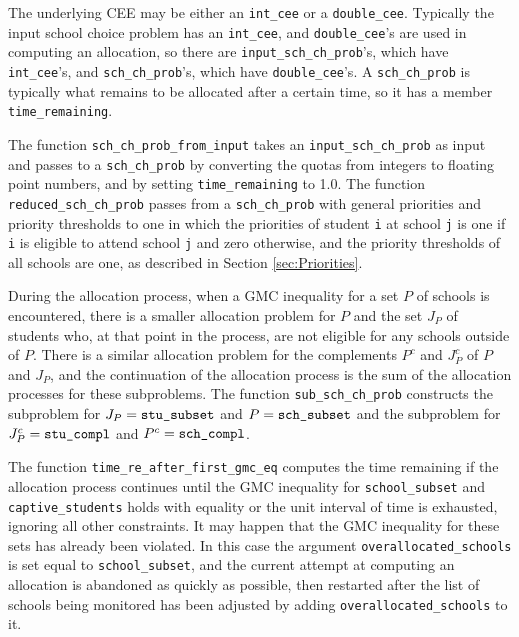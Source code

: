 \documentclass[12pt]{article}
\theoremstyle{definition}
\begin{document}
\begin{appendix}
The underlying CEE may be either an \texttt{int\_cee} or a
\texttt{double\_cee}.  Typically the input school choice problem has
an \texttt{int\_cee}, and \texttt{double\_cee}'s are used in computing
an allocation, so there are \texttt{input\_sch\_ch\_prob}'s, which
have \texttt{int\_cee}'s, and \texttt{sch\_ch\_prob}'s, which have
\texttt{double\_cee}'s.  A \texttt{sch\_ch\_prob} is typically what
remains to be allocated after a certain time, so it has a member
\texttt{time\_remaining}.

The function \texttt{sch\_ch\_prob\_from\_input} takes an
\texttt{input\_sch\_ch\_prob} as input and passes to a
\texttt{sch\_ch\_prob} by converting the quotas from integers to
floating point numbers, and by setting \texttt{time\_remaining} to
1.0.  The function \texttt{reduced\_sch\_ch\_prob} passes from a
\texttt{sch\_ch\_prob} with general priorities and priority thresholds
to one in which the priorities of student \texttt{i} at school
\texttt{j} is one if \texttt{i} is eligible to attend school
\texttt{j} and zero otherwise, and the priority thresholds of all
schools are one, as described in Section \ref{sec:Priorities}.

During the allocation process, when a GMC inequality for a set $P$ of
schools is encountered, there is a smaller allocation problem for $P$
and the set $J_P$ of students who, at that point in the process, are
not eligible for any schools outside of $P$.  There is a similar
allocation problem for the complements $P^c$ and $J_P^c$ of $P$ and
$J_P$, and the continuation of the allocation process is the sum of
the allocation processes for these subproblems.  The function
\texttt{sub\_sch\_ch\_prob} constructs the subproblem for $J_P =
\text{\texttt{stu\_subset}}$ and $P = \text{\texttt{sch\_subset}}$ and
the subproblem for $J_P^c = \text{\texttt{stu\_compl}}$ and $P^c =
\text{\texttt{sch\_compl}}$.  

The function \texttt{time\_re\_after\_first\_gmc\_eq} computes the time
remaining if the allocation process continues until the GMC inequality
for \texttt{school\_subset} and \texttt{captive\_students} holds with
equality or the unit interval of time is exhausted, ignoring all other
constraints.  It may happen that the GMC inequality for these sets has
already been violated.  In this case the argument
\texttt{overallocated\_schools} is set equal to
\texttt{school\_subset}, and the current attempt at computing an
allocation is abandoned as quickly as possible, then restarted after
the list of schools being monitored has been adjusted by adding
\texttt{overallocated\_schools} to it.


\end{appendix}
\end{document}
